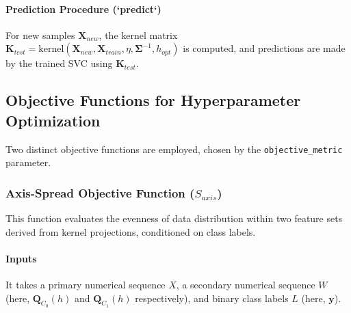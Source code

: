 \documentclass[conference]{IEEEtran} %
\newcommand{\mat}[1]{\mathbf{#1}} %
\newcommand{\vecbf}[1]{\bm{#1}} %
\begin{document}
\paragraph{Prediction Procedure (`predict`)} For new samples $\mat{X}_{new}$, the kernel matrix $\mat{K}_{test} = \text{kernel}(\mat{X}_{new}, \mat{X}_{train}, \eta, \mat{\Sigma}^{-1}, h_{opt})$ is computed, and predictions are made by the trained SVC using $\mat{K}_{test}$.

\subsection{Objective Functions for Hyperparameter Optimization}
Two distinct objective functions are employed, chosen by the \texttt{objective\_metric} parameter.

\subsubsection{Axis-Spread Objective Function ($S_{axis}$)}
This function evaluates the evenness of data distribution within two feature sets derived from kernel projections, conditioned on class labels.
\paragraph{Inputs} It takes a primary numerical sequence $X$, a secondary numerical sequence $W$ (here, $\vecbf{Q}_{C_0}(h)$ and $\vecbf{Q}_{C_1}(h)$ respectively), and binary class labels $L$ (here, $\vecbf{y}$).
\end{document}
